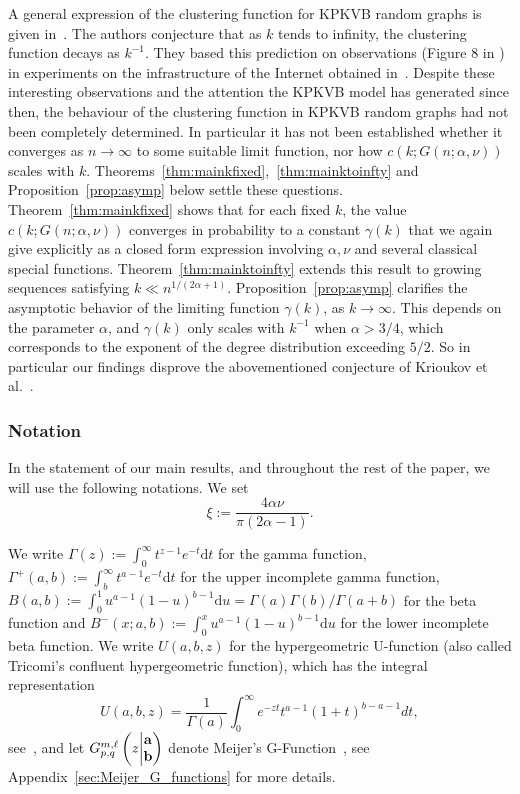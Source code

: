 A general expression of the clustering function for KPKVB random graphs is given in~\cite[Equation (59)]{krioukov2010hyperbolic}. 
The authors conjecture that as $k$ tends to infinity, the clustering function decays as $k^{-1}$. 
They based this prediction on observations (Figure 8 in \cite{krioukov2010hyperbolic}) in experiments on the infrastructure of the Internet obtained in~\cite{claffy2009internet}. Despite these interesting observations and the attention the KPKVB model has generated since then, the behaviour of the clustering function in KPKVB random graphs had not been completely determined. In particular it has not been established whether it converges as $n\to\infty$ to some suitable limit function, nor how $c(k;G(n; \alpha,\nu))$ scales with $k$. Theorems~\ref{thm:mainkfixed},~\ref{thm:mainktoinfty} and Proposition~\ref{prop:asymp} below settle these questions. Theorem~\ref{thm:mainkfixed} shows that for each fixed $k$, the value $c(k;G(n;\alpha,\nu))$ converges in probability to a constant $\gamma(k)$ that we again give explicitly as a closed form expression involving $\alpha,\nu$ and several classical special functions. Theorem~\ref{thm:mainktoinfty} extends this result to growing sequences satisfying $k \ll n^{1/(2\alpha+1)}$. Proposition~\ref{prop:asymp} clarifies the asymptotic behavior of the limiting function $\gamma(k)$, as $k\to\infty$. This depends on the parameter $\alpha$, and $\gamma(k)$ only scales with $k^{-1}$ when $\alpha > 3/4$, which corresponds to the exponent of the degree distribution exceeding $5/2$. 
So in particular our findings disprove the abovementioned conjecture of Krioukov et al.~\cite{krioukov2010hyperbolic}.


\subsubsection*{Notation}

In the statement of our main results, and throughout the rest of the paper, we will use the following notations. 
We set 
$$\xi := \frac{4\alpha\nu}{\pi(2\alpha-1)}. $$

We write $\Gamma(z) := \int_0^\infty t^{z-1} e^{-t}\text{d}t$ for the gamma function, 
$\Gamma^+(a,b) := \int_b^\infty t^{a-1} e^{-t}\text{d}t$ for the upper incomplete gamma function, 
 $B(a,b) := \int_0^1 u^{a-1}(1-u)^{b-1}\text{d}u = \Gamma(a)\Gamma(b) / \Gamma(a+b)$ for the beta function and 
 $B^-(x ; a,b) := \int_0^x u^{a-1}(1-u)^{b-1}\text{d}u$ for the lower incomplete beta function. 
We write $U(a,b,z)$ for the hypergeometric U-function (also called Tricomi's confluent hypergeometric function), which 
has the integral representation 
\[
	U(a,b,z) = \frac{1}{\Gamma(a)} \int_0^\infty e^{-zt} t^{a-1} (1+t)^{b-a-1} dt,
\] 
see~\cite[p.255 Equation (2)]{erdelyi1953higher}, and let $\MeijerGnew{m}{\ell}{p}{q}{{\bf a}}{{\bf b}}{z}$ denote 
Meijer's G-Function~\cite{meijer1946gfunction}, see Appendix~\ref{sec:Meijer_G_functions} for more details.

